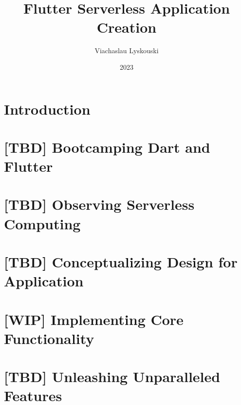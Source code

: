\documentclass[12pt, a4paper, twoside]{extreport}
\author{Viachaslau Lyskouski}
\title{Flutter Serverless Application Creation}
\date{2023}
\begin{document}


\maketitle

%

\tableofcontents



%

\section*{Introduction}


\newpage
\section{[TBD] Bootcamping Dart and Flutter}


\newpage
\section{[TBD] Observing Serverless Computing}


\newpage
\section{[TBD] Conceptualizing Design for Application}


\newpage
\section{[WIP] Implementing Core Functionality}







\newpage
\section{[TBD] Unleashing Unparalleled Features}

\end{document}
